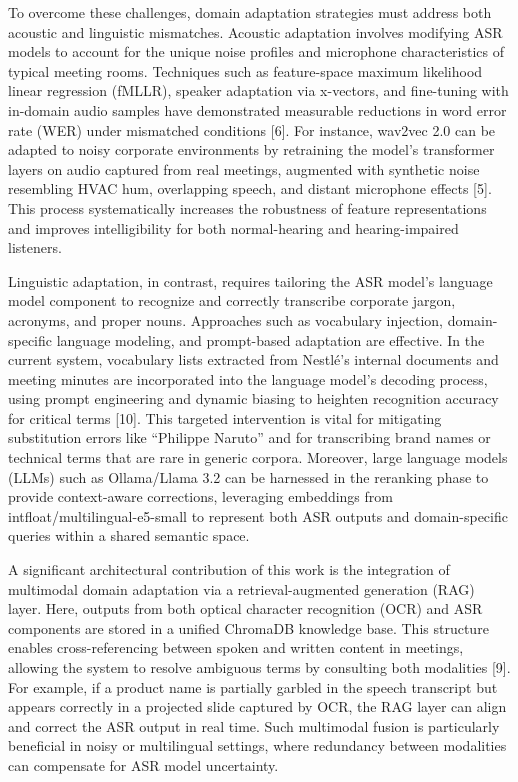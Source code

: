 \documentclass[12pt,a4paper]{article}
\begin{document}
To overcome these challenges, domain adaptation strategies must address both acoustic and linguistic mismatches. Acoustic adaptation involves modifying ASR models to account for the unique noise profiles and microphone characteristics of typical meeting rooms. Techniques such as feature-space maximum likelihood linear regression (fMLLR), speaker adaptation via x-vectors, and fine-tuning with in-domain audio samples have demonstrated measurable reductions in word error rate (WER) under mismatched conditions [6]. For instance, wav2vec 2.0 can be adapted to noisy corporate environments by retraining the model’s transformer layers on audio captured from real meetings, augmented with synthetic noise resembling HVAC hum, overlapping speech, and distant microphone effects [5]. This process systematically increases the robustness of feature representations and improves intelligibility for both normal-hearing and hearing-impaired listeners.


Linguistic adaptation, in contrast, requires tailoring the ASR model’s language model component to recognize and correctly transcribe corporate jargon, acronyms, and proper nouns. Approaches such as vocabulary injection, domain-specific language modeling, and prompt-based adaptation are effective. In the current system, vocabulary lists extracted from Nestlé’s internal documents and meeting minutes are incorporated into the language model’s decoding process, using prompt engineering and dynamic biasing to heighten recognition accuracy for critical terms [10]. This targeted intervention is vital for mitigating substitution errors like “Philippe Naruto” and for transcribing brand names or technical terms that are rare in generic corpora. Moreover, large language models (LLMs) such as Ollama/Llama 3.2 can be harnessed in the reranking phase to provide context-aware corrections, leveraging embeddings from intfloat/multilingual-e5-small to represent both ASR outputs and domain-specific queries within a shared semantic space.


A significant architectural contribution of this work is the integration of multimodal domain adaptation via a retrieval-augmented generation (RAG) layer. Here, outputs from both optical character recognition (OCR) and ASR components are stored in a unified ChromaDB knowledge base. This structure enables cross-referencing between spoken and written content in meetings, allowing the system to resolve ambiguous terms by consulting both modalities [9]. For example, if a product name is partially garbled in the speech transcript but appears correctly in a projected slide captured by OCR, the RAG layer can align and correct the ASR output in real time. Such multimodal fusion is particularly beneficial in noisy or multilingual settings, where redundancy between modalities can compensate for ASR model uncertainty.
\end{document}
